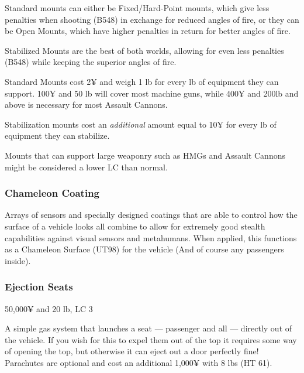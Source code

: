 \begin{multicols*}{2}
	Standard mounts can either be Fixed/Hard-Point mounts, which give less penalties when shooting (B548) in exchange for reduced angles of fire, or they can be Open Mounts, which have higher penalties in return for better angles of fire.
	
	Stabilized Mounts are the best of both worlds, allowing for even less penalties (B548) while keeping the superior angles of fire.
	
	Standard Mounts cost 2¥ and weigh 1 lb for every lb of equipment they can support. 100¥ and 50 lb will cover most machine guns, while 400¥ and 200lb and above is necessary for most Assault Cannons.
	
	Stabilization mounts cost an \textit{additional} amount equal to 10¥ for every lb of equipment they can stabilize.
	
	Mounts that can support large weaponry such as HMGs and Assault Cannons might be considered a lower LC than normal.
	
	\subsubsection{Chameleon Coating}
	
	Arrays of sensors and specially designed coatings that are able to control how the surface of a vehicle looks all combine to allow for extremely good stealth capabilities against visual sensors and metahumans. When applied, this functions as a Chameleon Surface (UT98) for the vehicle (And of course any passengers inside).
	
	
	
	\subsubsection{Ejection Seats}
	50,000¥ and 20 lb, LC 3
	
	A simple gas system that launches a seat — passenger and all — directly out of the vehicle. If you wish for this to expel them out of the top it requires some way of opening the top, but otherwise it can eject out a door perfectly fine! Parachutes are optional and cost an additional 1,000¥ with 8 lbs (HT 61).
	

\end{multicols*}
